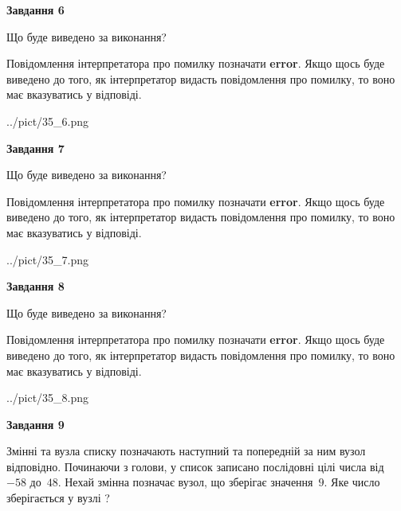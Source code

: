 \documentclass[12pt, ukrainian]{article}
\begin{document}
{\begin {large}
{\begin {center}\textbf{Завдання 6}\end {center}}\par
Що буде виведено за виконання?

Повідомлення інтерпретатора про помилку позначати \textbf{error}.
Якщо щось буде виведено до того, як інтерпретатор видасть повідомлення про помилку, 
то воно має вказуватись у відповіді. \par


\begin{center}
	{../pict/35_6.png}
\end{center}
\newpage

{\begin {center}\textbf{Завдання 7}\end {center}}\par
Що буде виведено за виконання?

Повідомлення інтерпретатора про помилку позначати \textbf{error}.
Якщо щось буде виведено до того, як інтерпретатор видасть повідомлення про помилку, 
то воно має вказуватись у відповіді. \par


\begin{center}
	{../pict/35_7.png}
\end{center}
\newpage

{\begin {center}\textbf{Завдання 8}\end {center}}\par
Що буде виведено за виконання?

Повідомлення інтерпретатора про помилку позначати \textbf{error}.
Якщо щось буде виведено до того, як інтерпретатор видасть повідомлення про помилку, 
то воно має вказуватись у відповіді. \par


\begin{center}
	{../pict/35_8.png}
\end{center}
\newpage

{\begin {center}\textbf{Завдання 9}\end {center}}\par
Змінні  та  вузла списку позначають наступний та попередній за ним вузол відповідно. Починаючи з голови, у список записано послідовні цілі числа від~$-58$ до~$48$. Нехай змінна  позначає вузол, що зберігає значення~$9$.
Яке число зберігається у вузлі  ?\par
\newpage


\end{large}}
\end{document}
